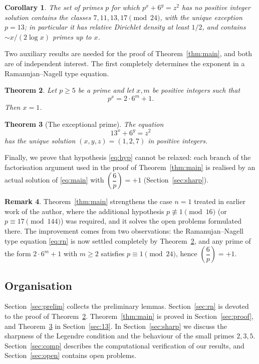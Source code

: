 \documentclass[preprint,12pt]{elsarticle}
\newtheorem{theorem}{Theorem}[section]
\newtheorem{corollary}[theorem]{Corollary}
\theoremstyle{definition}
\newtheorem{remark}[theorem]{Remark}
\newcommand{\leg}[2]{\left(\dfrac{#1}{#2}\right)}
\begin{document}
\begin{corollary}\label{cor:density}
The set of primes $p$ for which $p^{x}+6^{y}=z^{2}$ has no positive integer
solution contains the classes $7,11,13,17\pmod{24}$, with the unique
exception $p=13$; in particular it has relative Dirichlet density at least
$1/2$, and contains $\sim x/(2\log x)$ primes up to $x$.
\end{corollary}

Two auxiliary results are needed for the proof of Theorem~\ref{thm:main}, and
both are of independent interest. The first completely determines the
exponent in a Ramanujan--Nagell type equation.

\begin{theorem}\label{thm:rn}
Let $p\geq 5$ be a prime and let $x,m$ be positive integers such that
\begin{equation}\label{eq:rn}
p^{x}=2\cdot 6^{m}+1.
\end{equation}
Then $x=1$.
\end{theorem}

\begin{theorem}[The exceptional prime]\label{thm:13}
The equation
\[
13^{x}+6^{y}=z^{2}
\]
has the unique solution $(x,y,z)=(1,2,7)$ in positive integers.
\end{theorem}

Finally, we prove that hypothesis \eqref{eq:hyp} cannot be relaxed: each
branch of the factorisation argument used in the proof of
Theorem~\ref{thm:main} is realised by an actual solution of \eqref{eq:main}
with $\leg{6}{p}=+1$ (Section~\ref{sec:sharp}).

\begin{remark}\label{rem:improvement}
Theorem~\ref{thm:main} strengthens the case $n=1$ treated in earlier work of
the author, where the additional hypothesis $p\not\equiv 1\pmod{16}$ (or
$p\equiv 17\pmod{144}$) was required, and it solves the open problems
formulated there. The improvement comes from two observations: the
Ramanujan--Nagell type equation \eqref{eq:rn} is now settled completely by
Theorem~\ref{thm:rn}, and any prime of the form $2\cdot 6^{m}+1$ with
$m\geq 2$ satisfies $p\equiv 1\pmod{24}$, hence $\leg{6}{p}=+1$.
\end{remark}

\subsection{Organisation}

Section~\ref{sec:prelim} collects the preliminary lemmas.
Section~\ref{sec:rn} is devoted to the proof of Theorem~\ref{thm:rn}.
Theorem~\ref{thm:main} is proved in Section~\ref{sec:proof}, and
Theorem~\ref{thm:13} in Section~\ref{sec:13}. In Section~\ref{sec:sharp} we
discuss the sharpness of the Legendre condition and the behaviour of the
small primes $2,3,5$. Section~\ref{sec:comp} describes the computational
verification of our results, and Section~\ref{sec:open} contains open
problems.
\end{document}
